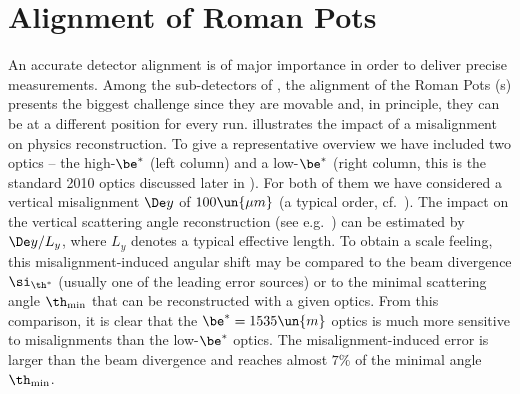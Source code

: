 \chapter[al]{Alignment of Roman Pots}


An accurate detector alignment is of major importance in order to deliver precise measurements. Among the sub-detectors of , the alignment of the Roman Pots (s) presents the biggest challenge since they are movable and, in principle, they can be at a different position for every run.  illustrates the impact of a misalignment on physics reconstruction. To give a representative overview we have included two optics -- the high-$\be^*$ (left column) and a low-$\be^*$ (right column, this is the standard 2010  optics discussed later in ). For both of them we have considered a vertical misalignment $\De y$ of $100\un{\mu m}$ (a typical order, cf.~). The impact on the vertical scattering angle reconstruction (see e.g.~) can be estimated by $\De y/L_y$, where $L_y$ denotes a typical effective length. To obtain a scale feeling, this misalignment-induced angular shift may be compared to the beam divergence $\si_{\th^*}$ (usually one of the leading error sources) or to the minimal scattering angle $\th_{\rm min}$ that can be reconstructed with a given optics. From this comparison, it is clear that the $\be^* = 1535\un{m}$ optics is much more sensitive to misalignments than the low-$\be^*$ optics. The misalignment-induced error is larger than the beam divergence and reaches almost $7\percent$ of the minimal angle $\th_{\rm min}$.


